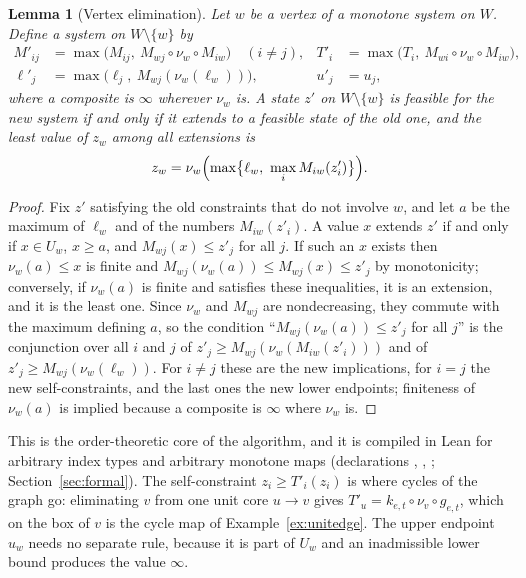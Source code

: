 \documentclass[11pt,a4paper]{article}
\theoremstyle{plain}
\newtheorem{lemma}[theorem]{Lemma}
\theoremstyle{definition}
\theoremstyle{remark}
\begin{document}
\begin{lemma}[Vertex elimination]\label{lem:eliminate}
Let $w$ be a vertex of a monotone system on $W$. Define a system on $W\setminus\{w\}$ by
\begin{equation}\label{eq:eliminate}
\begin{aligned}
  M'_{ij}&=\max\bigl(M_{ij},\ M_{wj}\circ\nu_w\circ M_{iw}\bigr)\quad(i\ne j), &
  T'_{i}&=\max\bigl(T_i,\ M_{wi}\circ\nu_w\circ M_{iw}\bigr),\\
  \ell'_j&=\max\bigl(\ell_j,\ M_{wj}(\nu_w(\ell_w))\bigr), & u'_j&=u_j,
\end{aligned}
\end{equation}
where a composite is $\infty$ wherever $\nu_w$ is. A state $z'$ on $W\setminus\{w\}$ is feasible for the new system if and only if it extends to a feasible state of the old one, and the least value of $z_w$ among all extensions is
\begin{equation}\label{eq:backsub}
  z_w=\nu_w\Bigl(\max\bigl\{\ell_w,\ \max_iM_{iw}(z'_i)\bigr\}\Bigr).
\end{equation}
\end{lemma}
\begin{proof}
Fix $z'$ satisfying the old constraints that do not involve $w$, and let $a$ be the maximum of $\ell_w$ and of the numbers $M_{iw}(z'_i)$. A value $x$ extends $z'$ if and only if $x\in U_w$, $x\ge a$, and $M_{wj}(x)\le z'_j$ for all $j$. If such an $x$ exists then $\nu_w(a)\le x$ is finite and $M_{wj}(\nu_w(a))\le M_{wj}(x)\le z'_j$ by monotonicity; conversely, if $\nu_w(a)$ is finite and satisfies these inequalities, it is an extension, and it is the least one. Since $\nu_w$ and $M_{wj}$ are nondecreasing, they commute with the maximum defining $a$, so the condition ``$M_{wj}(\nu_w(a))\le z'_j$ for all $j$'' is the conjunction over all $i$ and $j$ of $z'_j\ge M_{wj}(\nu_w(M_{iw}(z'_i)))$ and of $z'_j\ge M_{wj}(\nu_w(\ell_w))$. For $i\ne j$ these are the new implications, for $i=j$ the new self-constraints, and the last ones the new lower endpoints; finiteness of $\nu_w(a)$ is implied because a composite is $\infty$ where $\nu_w$ is.
\end{proof}

This is the order-theoretic core of the algorithm, and it is compiled in Lean for arbitrary index types and arbitrary monotone maps (declarations , , ; Section~\ref{sec:formal}). The self-constraint $z_i\ge T'_i(z_i)$ is where cycles of the graph go: eliminating $v$ from one unit core $u\to v$ gives $T'_u=k_{e,t}\circ\nu_v\circ g_{e,t}$, which on the box of $v$ is the cycle map of Example~\ref{ex:unitedge}. The upper endpoint $u_w$ needs no separate rule, because it is part of $U_w$ and an inadmissible lower bound produces the value $\infty$.
\end{document}
